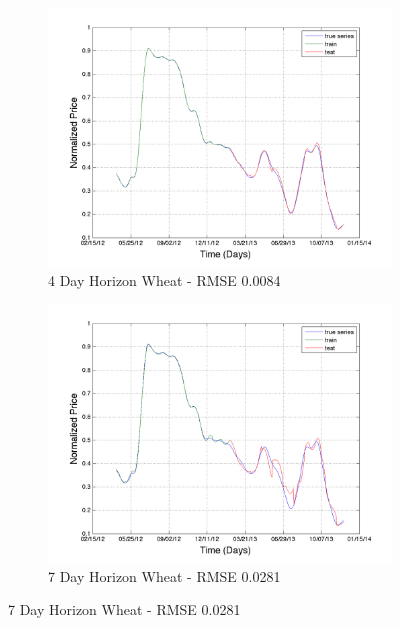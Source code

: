 \begin{figure}
        \centering
        \begin{subfigure}[b]{0.5\textwidth}
                \includegraphics[width=\textwidth]{img/model/wheat/model3_3/pred_4}
                \caption{4 Day Horizon Wheat - RMSE 0.0084}
                \label{fig:gull}
        \end{subfigure}%
           \begin{subfigure}[b]{0.5\textwidth}
                \includegraphics[width=\textwidth]{img/model/wheat/model3_3/pred_7}
                \caption{7 Day Horizon Wheat - RMSE 0.0281}
                \label{fig:gull}
        \end{subfigure}%
              \hfill    

\end{figure}
